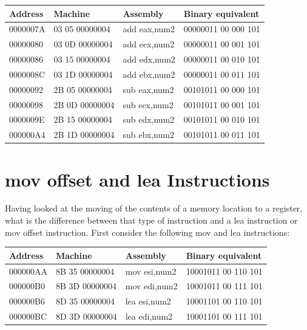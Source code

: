 \documentclass[10pt]{book}
\begin{document}
\begin{center}
\begin{tabular}{|l|l|l|l|}
\hline
Address & Machine & Assembly & Binary equivalent \\
\hline
0000007A & 03 05 00000004 & add eax,num2 & 00000011 00 000 101 \\
\hline
00000080 & 03 0D 00000004 & add ecx,num2 & 00000011 00 001 101 \\
\hline
00000086 & 03 15 00000004 & add edx,num2 & 00000011 00 010 101 \\
\hline
0000008C & 03 1D 00000004 & add ebx,num2 & 00000011 00 011 101 \\
\hline
00000092 & 2B 05 00000004 & sub eax,num2 & 00101011 00 000 101 \\
\hline
00000098 & 2B 0D 00000004 & sub ecx,num2 & 00101011 00 001 101 \\
\hline
0000009E & 2B 15 00000004 & sub edx,num2 & 00101011 00 010 101 \\
\hline
000000A4 & 2B 1D 00000004 & sub ebx,num2 & 00101011 00 011 101 \\
\hline
\end{tabular}
\end{center}

\section{mov offset and lea Instructions}
Having looked at the moving of the contents of a memory location to a register, what is the difference between that type of instruction and a lea instruction or mov offset instruction. First consider the following mov and lea instructions:

\begin{center}
\begin{tabular}{|l|l|l|l|}
\hline
Address & Machine & Assembly & Binary equivalent \\
\hline
000000AA & 8B 35 00000004 & mov esi,num2 & 10001011 00 110 101 \\
\hline
000000B0 & 8B 3D 00000004 & mov edi,num2 & 10001011 00 111 101 \\
\hline
000000B6 & 8D 35 00000004 & lea esi,num2 & 10001101 00 110 101 \\
\hline
000000BC & 8D 3D 00000004 & lea edi,num2 & 10001101 00 111 101 \\
\hline
\end{tabular}
\end{center}
\end{document}
